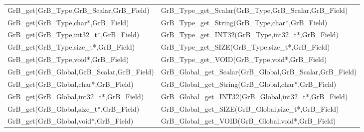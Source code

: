 \begin{table}[htb]
{\begin{tabular}{l|l}
{\sf GrB\_get(GrB\_Type,GrB\_Scalar,GrB\_Field)}  & {\sf GrB\_Type\_get\_Scalar(GrB\_Type,GrB\_Scalar,GrB\_Field)} \\
{\sf GrB\_get(GrB\_Type,char*,GrB\_Field)}        & {\sf GrB\_Type\_get\_String(GrB\_Type,char*,GrB\_Field)}       \\
{\sf GrB\_get(GrB\_Type,int32\_t*,GrB\_Field)}      & {\sf GrB\_Type\_get\_INT32(GrB\_Type,int32\_t*,GrB\_Field)}   \\
{\sf GrB\_get(GrB\_Type,size\_t*,GrB\_Field)}       & {\sf GrB\_Type\_get\_SIZE(GrB\_Type,size\_t*,GrB\_Field)}    \\
{\sf GrB\_get(GrB\_Type,void*,GrB\_Field)}          & {\sf GrB\_Type\_get\_VOID(GrB\_Type,void*,GrB\_Field)}       \\
\hline

{\sf GrB\_get(GrB\_Global,GrB\_Scalar,GrB\_Field)}  & {\sf GrB\_Global\_get\_Scalar(GrB\_Global,GrB\_Scalar,GrB\_Field)} \\
{\sf GrB\_get(GrB\_Global,char*,GrB\_Field)}        & {\sf GrB\_Global\_get\_String(GrB\_Global,char*,GrB\_Field)}       \\
{\sf GrB\_get(GrB\_Global,int32\_t*,GrB\_Field)}      & {\sf GrB\_Global\_get\_INT32(GrB\_Global,int32\_t*,GrB\_Field)}   \\
{\sf GrB\_get(GrB\_Global,size\_t*,GrB\_Field)}       & {\sf GrB\_Global\_get\_SIZE(GrB\_Global,size\_t*,GrB\_Field)}    \\
{\sf GrB\_get(GrB\_Global,void*,GrB\_Field)}          & {\sf GrB\_Global\_get\_VOID(GrB\_Global,void*,GrB\_Field)}       \\
\hline

\end{tabular}
}
\label{Tab:NonPolymorphic7}
\end{table}



